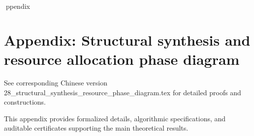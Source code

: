 ppendix

\section*{Appendix: Structural synthesis and resource allocation phase diagram}

See corresponding Chinese version 28_structural_synthesis_resource_phase_diagram.tex for detailed proofs and constructions.

This appendix provides formalized details, algorithmic specifications, and auditable certificates supporting the main theoretical results.
